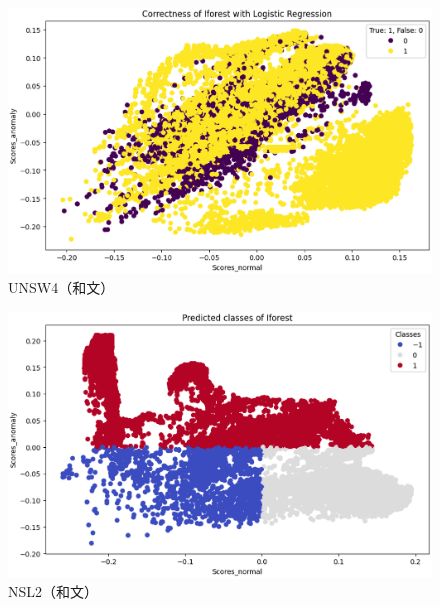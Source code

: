 \documentclass{css}
\begin{document}
\begin{figure}[tb]
    \centering
    \includegraphics[width=\linewidth]{pictures/eps/UNSW4.eps}
    \caption{UNSW4（和文）}
    \label{fig:UNSW4}
\end{figure}

\begin{figure}[tb]
    \centering
    \includegraphics[width=\linewidth]{pictures/eps/NSL2.eps}
    \caption{NSL2（和文）}
    \label{fig:NSL2}
\end{figure}
\end{document}

